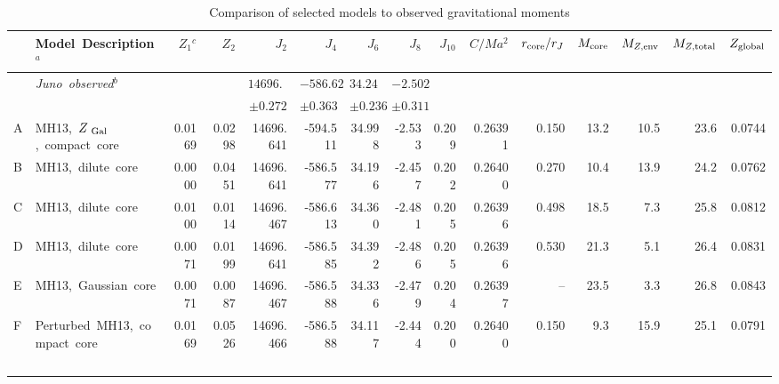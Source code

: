 \begin{sidewaystable}[hp]
\caption{Comparison of selected models to observed gravitational moments}
\label{tab:models}

\begin{adjustbox}{max width=\textheight}
\begin{tabular}{llrrrrrrrrrrrrr}
    \hline
    
    & Model~Description$^{a}$ &    $Z_1$$^{c}$ &        $Z_2$ &            $J_2$ &          $J_4$ &         $J_6$        &        $J_8$ &        $J_{10}$ &     $C/Ma^2$ &  $r_{\rm core}/r_J$ &     $M_{\rm core}$ &        $M_{Z,{\rm env}}$ &  $M_{Z,{\rm total}}$ &  $Z_{\rm global}$ \\
\hline
& \it{Juno}~observed$^{b}$                        & & & $14696.514$   & $-586.623$   &  $34.244$   & $-2.502$ &   &  &         &  &         &  &       \\
 &                                         & & & $\pm 0.272$   & $\pm 0.363$   &  $\pm 0.236$  & $\pm 0.311$ &  &  &         &  &         &  &       \\
\hline
A & MH13,~$Z_{\rm~Gal}$,~compact~core                &  0.0169  &  0.0298  &  14696.641  &  -594.511  &  34.998  &  -2.533  &  0.209  &  0.26391  &  0.150  &  13.2  &  10.5  &  23.6  &  0.0744  \\
\rowcolor{blue!15}
B & MH13,~dilute~core                   &  0.0000  &  0.0451  &  14696.641  &  -586.577  &  34.196  &  -2.457  &  0.202  &  0.26400  &  0.270  &  10.4  &  13.9  &  24.2  &  0.0762  \\
\rowcolor{blue!15}
C & MH13,~dilute~core                  &  0.0100  &  0.0114  &  14696.467  &  -586.613  &  34.360  &  -2.481  &  0.205  &  0.26396  &  0.498  &  18.5  &  7.3   &  25.8  &  0.0812  \\
\rowcolor{blue!15}
D & MH13,~dilute~core                 &  0.0071  &  0.0199  &  14696.641  &  -586.585  &  34.392  &  -2.486  &  0.205  &  0.26396  &  0.530  &  21.3  &  5.1   &  26.4  &  0.0831  \\
\rowcolor{blue!15}
E & MH13,~Gaussian~core                &  0.0071  &  0.0087  &  14696.467  &  -586.588  &  34.336  &  -2.479  &  0.204  &  0.26397  &  --     &  23.5  &  3.3   &  26.8  &  0.0843  \\
\rowcolor{blue!15}
F & Perturbed~MH13,~compact~core  &  0.0169  &  0.0526  &  14696.466  &  -586.588  &  34.117  &  -2.444  &  0.200  &  0.26400  &  0.150  &  9.3   &  15.9  &  25.1  &  0.0791  \\
$$
\end{tabular}
\end{adjustbox}
\end{sidewaystable}
